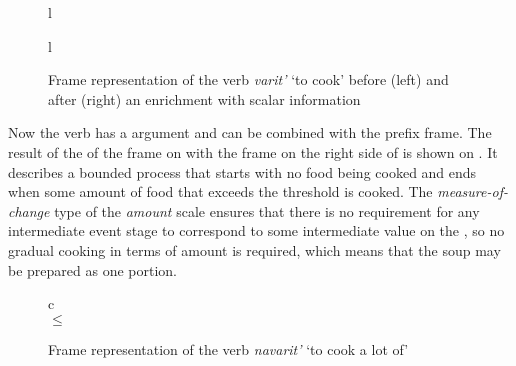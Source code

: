 \begin{figure}
\begin{tabular}[t]{l}
\end{tabular}
\hfill
\begin{tabular}[t]{l}
\end{tabular}
\caption{Frame representation of the verb \textit{varit'} `to cook' before (left) and after (right) an enrichment with scalar information \label{frame:varit}}
\end{figure}

Now the verb has a {\scshape\VERBDIM} argument and can be combined with the prefix frame. The result of the  of the frame on  with the frame on the right side of  is shown on . It describes a bounded process that starts with no food being cooked and ends when some amount of food that exceeds the threshold is cooked. The \textit{measure-of-change} type of the \textit{amount} scale ensures that there is no requirement for any intermediate event stage to correspond to some intermediate value on the , so no gradual cooking in terms of amount is required, which means that the soup may be prepared as one portion.

\begin{figure}
\begin{tabular}{c}
\\
 $\leq$ \\
\end{tabular}
\caption{Frame representation of the verb \textit{navarit'} `to cook a lot of' \label{frame:navarit}}
\end{figure}

